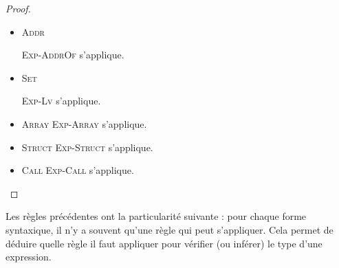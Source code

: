 \begin{proof}
\begin{itemize}
  \item \textsc{Addr}

    \textsc{Exp-AddrOf} s'applique.

  \item \textsc{Set}

    \textsc{Exp-Lv} s'applique.

  \item \textsc{Array}
    \textsc{Exp-Array} s'applique.

  \item \textsc{Struct}
    \textsc{Exp-Struct} s'applique.

  \item \textsc{Call}
    \textsc{Exp-Call} s'applique.

\end{itemize}

\end{proof}

Les règles précédentes ont la particularité suivante : pour chaque forme
syntaxique, il n'y a souvent qu'une règle qui peut s'appliquer. Cela permet de
déduire quelle règle il faut appliquer pour vérifier (ou inférer) le type d'une
expression.

